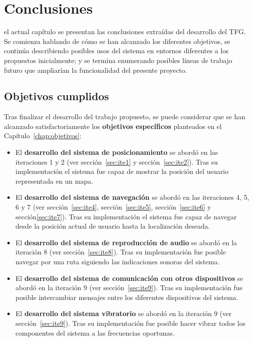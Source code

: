 \chapter{Conclusiones}
\label{chap:conclusiones}

 el actual capítulo se presentan las conclusiones extraídas del desarrollo del
\acs{TFG}. Se comienza hablando de cómo se han alcanzado los diferentes objetivos, se continúa
describiendo posibles usos del sistema en entornos diferentes a los propuestos inicialmente; y se
termina enumerando posibles líneas de trabajo futuro que ampliarían la funcionalidad del presente
proyecto.

\section{Objetivos cumplidos}

Tras finalizar el desarrollo del trabajo propuesto, se puede considerar que se han alcanzado
satisfactoriamente los \textbf{objetivos específicos} planteados en el
Capítulo~\ref{chap:objetivos}:

\begin{itemize}
  \item El \textbf{desarrollo del sistema de posicionamiento} se abordó en las iteraciones 1 y 2
    (ver sección~\ref{sec:ite1} y sección~\ref{sec:ite2}). Tras su implementación el sistema fue
    capaz de mostrar la posición del usuario representada en un mapa.

  \item El \textbf{desarrollo del sistema de navegación} se abordó en las iteraciones 4, 5, 6 y 7
    (ver sección~\ref{sec:ite4}, sección~\ref{sec:ite5}, sección~\ref{sec:ite6} y
    sección\ref{sec:ite7}). Tras su implementación el sistema fue capaz de navegar desde la posición
    actual de usuario hasta la localización deseada.

  \item El \textbf{desarrollo del sistema de reproducción de audio} se abordó en la iteración 8 (ver
    sección~\ref{sec:ite8}). Tras su implementación fue posible navegar por una ruta siguiendo las
    indicaciones sonoras del sistema.

  \item El \textbf{desarrollo del sistema de comunicación con otros dispositivos} se abordó en la
    iteración 9 (ver sección~\ref{sec:ite9}). Tras su implementación fue posible intercambiar
    mensajes entre los diferentes dispositivos del sistema.

  \item El \textbf{desarrollo del sistema vibratorio} se abordó en la iteración 9 (ver
    sección~\ref{sec:ite9}). Tras su implementación fue posible hacer vibrar todos los componentes
    del sistema a las frecuencias oportunas.

\end{itemize}

